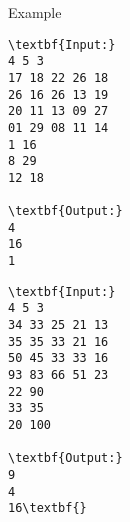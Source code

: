 Example
\begin{verbatim}
\textbf{Input:}
4 5 3
17 18 22 26 18
26 16 26 13 19
20 11 13 09 27
01 29 08 11 14
1 16
8 29
12 18

\textbf{Output:}
4
16
1
\end{verbatim}
\begin{verbatim}
\textbf{Input:}
4 5 3
34 33 25 21 13
35 35 33 21 16
50 45 33 33 16
93 83 66 51 23
22 90
33 35
20 100

\textbf{Output:}
9
4
16\textbf{}\end{verbatim}